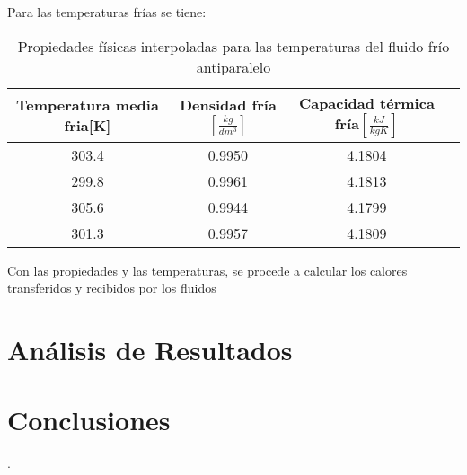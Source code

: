 \documentclass[letterpaper,11pt]{article} %
\begin{document}
\newp
Para las temperaturas frías se tiene:
\begin{table}[htbp]
    \centering
    \caption{Propiedades físicas interpoladas para las temperaturas del fluido frío antiparalelo}
    \begin{tabular}{c|c|c|c|}
    
        Temperatura media fria[K]&Densidad fría $[\frac{kg}{dm^3}]$ & Capacidad térmica fría$[\frac{kJ}{kgK}]$\\
        \hline
        303.4 & 0.9950 & 4.1804\\
        299.8 & 0.9961 & 4.1813\\
        305.6 & 0.9944 & 4.1799\\
        301.3 & 0.9957 & 4.1809 \\
    \end{tabular}
    \label{tab:propfriaantiparalelo}
\end{table}
\newp










Con las propiedades y las temperaturas, se procede a calcular los calores transferidos y recibidos por los fluidos

\newpage
\section{Análisis de Resultados}



\newpage
\section{Conclusiones}.




\end{document}
